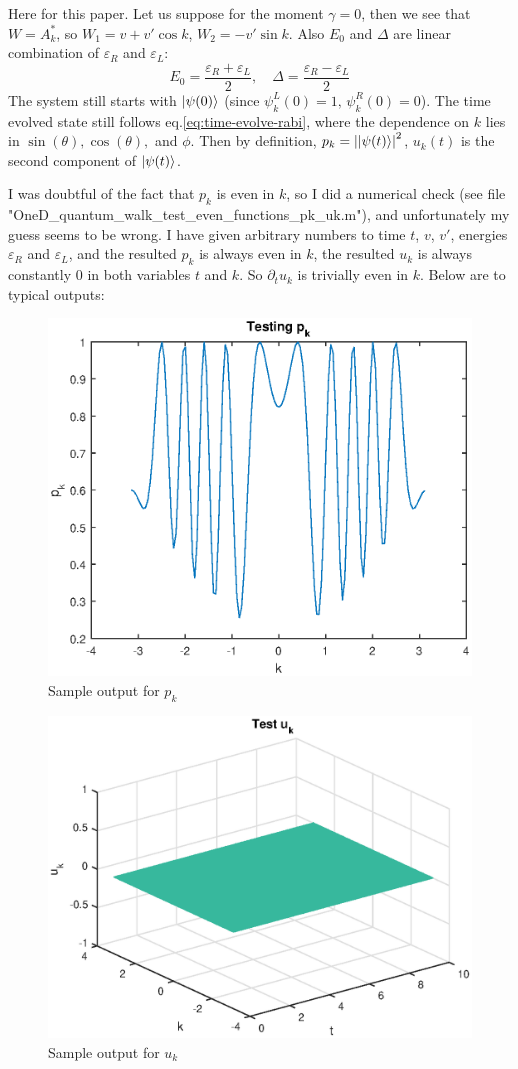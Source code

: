 \documentclass{article}
\begin{document}
Here for this paper. Let us suppose for the moment $\gamma=0$, then we
see that $W=A_k^*$, so $W_1 = v+v'\cos{k}$, $W_2=-v'\sin{k}$. 
Also $E_0$ and $\Delta$ are linear combination of
$\varepsilon_R$ and $\varepsilon_L$:
\begin{equation}
    E_0 =\frac{\varepsilon_R+\varepsilon_L}{2},\quad
    \Delta =\frac{\varepsilon_R-\varepsilon_L}{2}
\end{equation}
The system still starts with
$\ket{\psi(0)}$ (since $\psi^L_k(0)=1,\,\psi^R_k(0)=0$). The time
evolved state still follows eq.\ref{eq:time-evolve-rabi}, where the
dependence on $k$ lies in $\sin(\theta),\cos(\theta),$ and $\phi$.
Then by definition, $p_k=\abs{\ket{\psi(t)}}^2$, $u_k(t)$ is the second
component of $\ket{\psi(t)}$.

I was doubtful of the fact that $p_k$ is even in $k$, so I did a
numerical check (see file
"{OneD\_quantum\_walk\_test\_even\_functions\_pk\_uk.m}"), and
unfortunately my guess seems to be wrong. I have given arbitrary
numbers to time $t$, $v$, $v'$, energies $\varepsilon_R$ and
$\varepsilon_L$, and the resulted $p_k$ is always even in $k$, the
resulted $u_k$ is always constantly $0$ in both variables $t$ and $k$.
So $\partial_t u_k$ is trivially even in $k$. Below are to typical
outputs:

\begin{figure}[H]
    \centering
    \includegraphics[width=0.6\linewidth]{pics/Sample-output-for-p_k.eps}
    \caption{Sample output for $p_k$}
\end{figure}

\begin{figure}[H]
    \centering
    \includegraphics[width=0.6\linewidth]{pics/Sample-output-for-u_k.eps}
    \caption{Sample output for $u_k$}
\end{figure}
\end{document}
